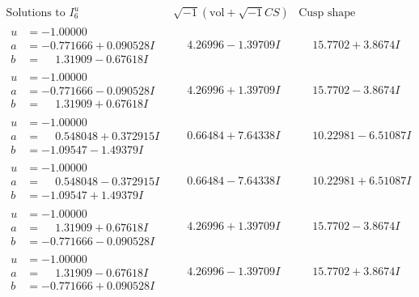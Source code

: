 \documentclass[1p]{elsarticle_modified}
\theoremstyle{definition}
\newcommand{\I}{\sqrt{-1}}
\begin{document}
$$\begin{array}{c|c|c}  
\text{Solutions to }I^u_{6}& \I (\text{vol} + \sqrt{-1}CS) & \text{Cusp shape}\\
 \hline 
\begin{aligned}
u &= -1.00000\phantom{ +0.000000I} \\
a &= -0.771666 + 0.090528 I \\
b &= \phantom{-}1.31909 - 0.67618 I\end{aligned}
 & \phantom{-}4.26996 - 1.39709 I & \phantom{-}15.7702 + 3.8674 I \\ \hline\begin{aligned}
u &= -1.00000\phantom{ +0.000000I} \\
a &= -0.771666 - 0.090528 I \\
b &= \phantom{-}1.31909 + 0.67618 I\end{aligned}
 & \phantom{-}4.26996 + 1.39709 I & \phantom{-}15.7702 - 3.8674 I \\ \hline\begin{aligned}
u &= -1.00000\phantom{ +0.000000I} \\
a &= \phantom{-}0.548048 + 0.372915 I \\
b &= -1.09547 - 1.49379 I\end{aligned}
 & \phantom{-}0.66484 + 7.64338 I & \phantom{-}10.22981 - 6.51087 I \\ \hline\begin{aligned}
u &= -1.00000\phantom{ +0.000000I} \\
a &= \phantom{-}0.548048 - 0.372915 I \\
b &= -1.09547 + 1.49379 I\end{aligned}
 & \phantom{-}0.66484 - 7.64338 I & \phantom{-}10.22981 + 6.51087 I \\ \hline\begin{aligned}
u &= -1.00000\phantom{ +0.000000I} \\
a &= \phantom{-}1.31909 + 0.67618 I \\
b &= -0.771666 - 0.090528 I\end{aligned}
 & \phantom{-}4.26996 + 1.39709 I & \phantom{-}15.7702 - 3.8674 I \\ \hline\begin{aligned}
u &= -1.00000\phantom{ +0.000000I} \\
a &= \phantom{-}1.31909 - 0.67618 I \\
b &= -0.771666 + 0.090528 I\end{aligned}
 & \phantom{-}4.26996 - 1.39709 I & \phantom{-}15.7702 + 3.8674 I \\ \hline\begin{aligned}

\end{aligned}
\end{array}$$
\end{document}
